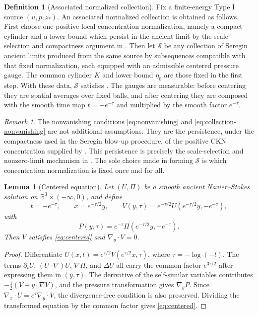 \documentclass[11pt]{amsart}
\theoremstyle{plain}
\newtheorem{lemma}[theorem]{Lemma}
\theoremstyle{definition}
\newtheorem{definition}[theorem]{Definition}
\theoremstyle{remark}
\newtheorem{remark}[theorem]{Remark}
\numberwithin{equation}{section}
\begin{document}
\begin{definition}[Associated normalized collection]\label{def:associated-collection}
Fix a finite-energy Type I source \((u,p,z_*)\).  An associated normalized
collection is obtained as follows.  First choose one positive local
concentration normalization, namely a compact cylinder and a lower bound which
persist in the ancient limit by the scale selection and compactness argument
in .  Then let
\(\mathcal S\) be any collection of Seregin ancient limits produced from the
same source by subsequences compatible with that fixed normalization, each
equipped with an admissible centered pressure gauge.  The common cylinder
\(K\) and lower bound \(\eta_0\) are those fixed in the first step.  With these
data, \(\mathcal S\) satisfies .  The gauges
are measurable: before centering they are spatial averages over fixed balls,
and after centering they are composed with the smooth time map
\(t=-e^{-\tau}\) and multiplied by the smooth factor \(e^{-\tau}\).
\end{definition}

\begin{remark}\label{rem:normalization}
The nonvanishing conditions \eqref{eq:nonvanishing} and
\eqref{eq:collection-nonvanishing} are not additional assumptions.  They are
the persistence, under the compactness used in the Seregin blow-up procedure,
of the positive CKN concentration supplied by .
This persistence is precisely the scale-selection and nonzero-limit mechanism
in .  The sole choice made in forming
\(\mathcal S\) is which concentration normalization is fixed once and for all.
\end{remark}

\begin{lemma}[Centered equation]\label{lem:centered-equation}
Let \((U,\Pi)\) be a smooth ancient Navier--Stokes solution on
\(\mathbb R^3\times(-\infty,0)\), and define
\[
   t=-e^{-\tau},\qquad x=e^{-\tau/2}y,\qquad
   V(y,\tau)=e^{-\tau/2}U(e^{-\tau/2}y,-e^{-\tau}),
\]
with
\[
   P(y,\tau)=e^{-\tau}\Pi(e^{-\tau/2}y,-e^{-\tau}).
\]
Then \(V\) satisfies \eqref{eq:centered} and \(\nabla_y\cdot V=0\).
\end{lemma}

\begin{proof}
Differentiate \(U(x,t)=e^{\tau/2}V(e^{\tau/2}x,\tau)\), where
\(\tau=-\log(-t)\).  The terms \(\partial_tU\), \((U\cdot\nabla)U\),
\(\nabla\Pi\), and \(\Delta U\) all carry the common factor
\(e^{3\tau/2}\) after expressing them in \((y,\tau)\).  The derivative of the
self-similar variables contributes
\(-\frac12(V+y\cdot\nabla V)\), and the pressure transformation gives
\(\nabla_yP\).  Since
\(\nabla_x\cdot U=e^\tau\nabla_y\cdot V\), the divergence-free condition is
also preserved.  Dividing the transformed equation by the common factor gives
\eqref{eq:centered}.
\end{proof}
\end{document}
